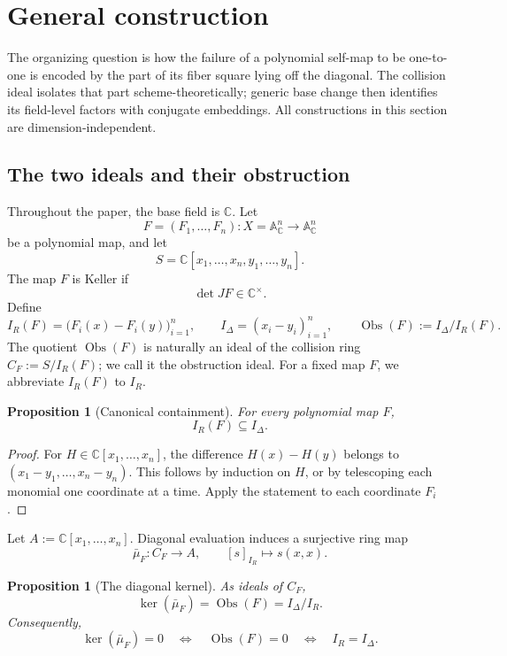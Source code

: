 \documentclass[11pt]{article}
\newtheorem{proposition}[theorem]{Proposition}
\theoremstyle{remark}
\theoremstyle{definition}
\newcommand{\A}{\mathbb A}
\newcommand{\C}{\mathbb C}
\newcommand{\Obs}{\operatorname{Obs}}
\begin{document}
\section{General construction}
\label{sec:general-construction}

The organizing question is how the failure of a polynomial self-map to be
one-to-one is encoded by the part of its fiber square lying off the diagonal.
The collision ideal isolates that part scheme-theoretically; generic base
change then identifies its field-level factors with conjugate embeddings.
All constructions in this section are dimension-independent.

\subsection{The two ideals and their obstruction}
\label{sec:collision-ideals}

Throughout the paper, the base field is \(\C\).  Let
\[
  F=(F_1,\dots,F_n)\colon
  X=\A^n_{\C}\longrightarrow\A^n_{\C}
\]
be a polynomial map, and let
\[
  S=\C[x_1,\dots,x_n,y_1,\dots,y_n].
\]
The map \(F\) is Keller if
\[
  \det JF\in\C^\times.
\]
Define
\[
  I_R(F)=\bigl(F_i(x)-F_i(y)\bigr)_{i=1}^{n},
  \qquad
  I_\Delta=(x_i-y_i)_{i=1}^{n},
  \qquad
  \Obs(F):=I_\Delta/I_R(F).
\]
The quotient \(\Obs(F)\) is naturally an ideal of the collision ring
\(C_F:=S/I_R(F)\); we call it the obstruction ideal.
For a fixed map \(F\), we abbreviate \(I_R(F)\) to \(I_R\).

\begin{proposition}[Canonical containment]
\label{prop:collision-contained-in-diagonal}
For every polynomial map \(F\),
\[
  I_R(F)\subseteq I_\Delta.
\]
\end{proposition}

\begin{proof}
For \(H\in\C[x_1,\dots,x_n]\), the difference \(H(x)-H(y)\) belongs to
\((x_1-y_1,\dots,x_n-y_n)\).  This follows by induction on \(H\), or by
telescoping each monomial one coordinate at a time.  Apply the statement
to each coordinate \(F_i\).
\end{proof}

Let \(A:=\C[x_1,\dots,x_n]\).  Diagonal evaluation induces a surjective ring
map
\[
  \bar\mu_F\colon C_F\longrightarrow A,
  \qquad
  [s]_{I_R}\longmapsto s(x,x).
\]

\begin{proposition}[The diagonal kernel]
\label{prop:obstruction-kernel}
As ideals of \(C_F\),
\[
  \ker(\bar\mu_F)
  =
  \Obs(F)
  =
  I_\Delta/I_R.
\]
Consequently,
\[
  \ker(\bar\mu_F)=0
  \quad\Longleftrightarrow\quad
  \Obs(F)=0
  \quad\Longleftrightarrow\quad
  I_R=I_\Delta.
\]
\end{proposition}
\end{document}
